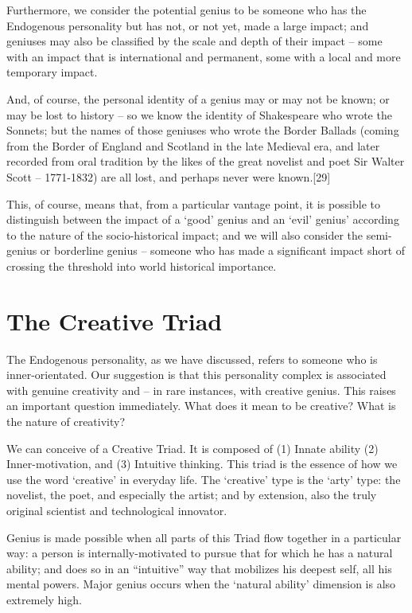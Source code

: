 \documentclass[
]{book}
\begin{document}
Furthermore, we consider the potential genius to be someone who has the Endogenous personality but has not, or not yet, made a large impact; and geniuses may also be classified by the scale and depth of their impact -- some with an impact that is international and permanent, some with a local and more temporary impact.

And, of course, the personal identity of a genius may or may not be known; or may be lost to history -- so we know the identity of Shakespeare who wrote the Sonnets; but the names of those geniuses who wrote the Border Ballads (coming from the Border of England and Scotland in the late Medieval era, and later recorded from oral tradition by the likes of the great novelist and poet Sir Walter Scott -- 1771-1832) are all lost, and perhaps never were known.{[}29{]}

This, of course, means that, from a particular vantage point, it is possible to distinguish between the impact of a `good' genius and an `evil' genius' according to the nature of the socio-historical impact; and we will also consider the semi-genius or borderline genius -- someone who has made a significant impact short of crossing the threshold into world historical importance.

\hypertarget{the-creative-triad}{%
\chapter{The Creative Triad}\label{the-creative-triad}}

The Endogenous personality, as we have discussed, refers to someone who is inner-orientated. Our suggestion is that this personality complex is associated with genuine creativity and -- in rare instances, with creative genius. This raises an important question immediately. What does it mean to be creative? What is the nature of creativity?

We can conceive of a Creative Triad. It is composed of (1) Innate ability (2) Inner-motivation, and (3) Intuitive thinking. This triad is the essence of how we use the word `creative' in everyday life. The `creative' type is the `arty' type: the novelist, the poet, and especially the artist; and by extension, also the truly original scientist and technological innovator.

Genius is made possible when all parts of this Triad flow together in a particular way: a person is internally-motivated to pursue that for which he has a natural ability; and does so in an ``intuitive'' way that mobilizes his deepest self, all his mental powers. Major genius occurs when the `natural ability' dimension is also extremely high.
\end{document}
